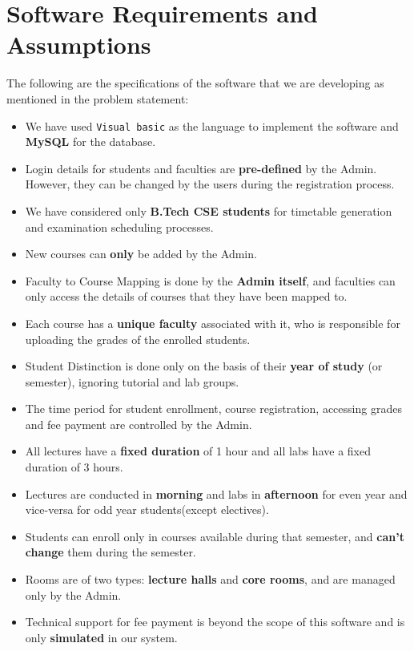 \documentclass[12pt,a4paper]{article}
\begin{document}
\section{Software Requirements and Assumptions}
The following are the specifications of the software that we are developing as mentioned in the problem statement:
\begin{itemize}
    \item We have used \texttt{Visual basic} as the language to implement the software and \textbf{MySQL} for the database.
    \item Login details for students and faculties are \textbf{pre-defined} by the Admin. However, they can be changed by the users during the registration process.
    \item We have considered only \textbf{B.Tech CSE students} for timetable generation and examination scheduling processes.
    \item New courses can \textbf{only} be added by the Admin.
    \item Faculty to Course Mapping is done by the \textbf{Admin itself}, and faculties can only access the details of courses that they have been mapped to.
    \item Each course has a \textbf{unique faculty} associated with it, who is responsible for uploading the grades of the enrolled students.
    \item Student Distinction is done only on the basis of their \textbf{year of study} (or semester), ignoring tutorial and lab groups.
    \item The time period for student enrollment, course registration, accessing grades and fee payment are controlled by the Admin.
    \item All lectures have a \textbf{fixed duration} of 1 hour and all labs have a fixed duration of 3 hours.
    \item Lectures are conducted in \textbf{morning} and labs in \textbf{afternoon} for even year and vice-versa for odd year students(except electives).
    \item Students can enroll only in courses available during that semester, and \textbf{can't change} them during the semester.
    \item Rooms are of two types: \textbf{lecture halls} and \textbf{core rooms}, and are managed only by the Admin.
    \item Technical support for fee payment is beyond the scope of this software and is only \textbf{simulated} in our system.
\end{itemize}
\end{document}
